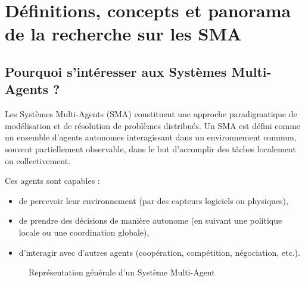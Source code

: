 \documentclass[ twoside,openright,titlepage,numbers=noenddot,headinclude,%
                footinclude=true,cleardoublepage=empty,abstractoff, %
                BCOR=5mm,paper=a4,fontsize=11pt,%
                french,american,%
                ]{scrreprt}
\begin{document}
\section{Définitions, concepts et panorama de la recherche sur les SMA}\label{sec:sma-concepts}


\subsection*{Pourquoi s’intéresser aux Systèmes Multi-Agents ?}

Les Systèmes Multi-Agents (SMA) constituent une approche paradigmatique de modélisation et de résolution de problèmes distribués. Un SMA est défini comme un ensemble d’agents autonomes interagissant dans un environnement commun, souvent partiellement observable, dans le but d’accomplir des tâches localement ou collectivement.

Ces agents sont capables :
\begin{itemize}
    \item de percevoir leur environnement (par des capteurs logiciels ou physiques),
    \item de prendre des décisions de manière autonome (en suivant une politique locale ou une coordination globale),
    \item d’interagir avec d’autres agents (coopération, compétition, négociation, etc.).
\end{itemize}

\begin{figure}[H]
    \centering
    \caption{Représentation générale d’un Système Multi-Agent}
    \label{fig:sma-schema}
\end{figure}
\end{document}
